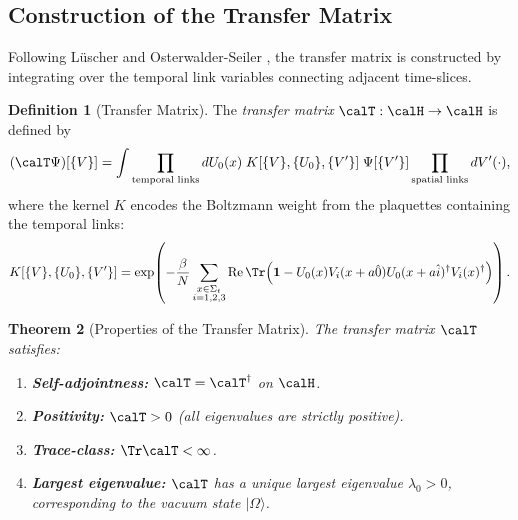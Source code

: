 \documentclass[12pt, a4paper]{article}
\theoremstyle{plain}
\newtheorem{theorem}{Theorem}[section]
\theoremstyle{definition}
\newtheorem{definition}[theorem]{Definition}
\begin{document}
\subsection{Construction of the Transfer Matrix}

Following L\"uscher \citep{Luscher1977} and Osterwalder-Seiler
\citep{OsterwalderSeiler1978}, the transfer matrix is constructed by
integrating over the temporal link variables connecting adjacent time-slices.

\begin{definition}[Transfer Matrix]\label{def:transfer}
  The \emph{transfer matrix} $\calT: \calH \to \calH$ is defined by
  \begin{equation}\label{eq:transfer}
    (\calT \Psi)[\{V\}] = \int \prod_{\text{temporal links}} dU_0(x)
    \; K[\{V\}, \{U_0\}, \{V'\}] \; \Psi[\{V'\}]
    \prod_{\text{spatial links}} dV'(\cdot),
  \end{equation}
  where the kernel $K$ encodes the Boltzmann weight from the plaquettes
  containing the temporal links:
  \begin{equation}
    K[\{V\}, \{U_0\}, \{V'\}] = \exp\!\left(
    -\frac{\beta}{N} \sum_{\substack{x \in \Sigma_t \\ i=1,2,3}}
    \mathrm{Re}\,\Tr\!\left(
    \mathbf{1} - U_0(x) V_i(x+a\hat{0}) U_0(x+a\hat{i})^\dagger V_i(x)^\dagger
    \right)\right).
  \end{equation}
\end{definition}

\begin{theorem}[Properties of the Transfer Matrix]\label{thm:transfer}
  The transfer matrix $\calT$ satisfies:
  \begin{enumerate}[label=(\alph*)]
    \item \textbf{Self-adjointness:} $\calT = \calT^\dagger$ on $\calH$.
    \item \textbf{Positivity:} $\calT > 0$ (all eigenvalues are strictly positive).
    \item \textbf{Trace-class:} $\Tr \calT < \infty$.
    \item \textbf{Largest eigenvalue:} $\calT$ has a unique largest eigenvalue
      $\lambda_0 > 0$, corresponding to the vacuum state $|\Omega\rangle$.
  \end{enumerate}
\end{theorem}
\end{document}

